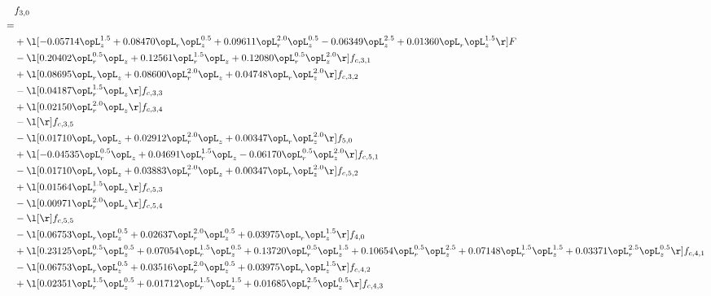 \begin{alignat}{2} 
\label{eq:f_30_2} 
& f_{3,0} \nonumber \\ 
 = \\ 
& + \l[  -0.05714 \opL_z^{1.5} +  0.08470 \opL_r \opL_z^{0.5} +  0.09611 \opL_r^{2.0} \opL_z^{0.5}   -0.06349 \opL_z^{2.5} +  0.01360 \opL_r \opL_z^{1.5}  \r] F \nonumber \\ 
& - \l[  0.20402 \opL_r^{0.5} \opL_z +  0.12561 \opL_r^{1.5} \opL_z +  0.12080 \opL_r^{0.5} \opL_z^{2.0}  \r] f_{c,3,1} \nonumber \\ 
& + \l[  0.08695 \opL_r \opL_z +  0.08600 \opL_r^{2.0} \opL_z +  0.04748 \opL_r \opL_z^{2.0}  \r] f_{c,3,2} \nonumber \\ 
& - \l[  0.04187 \opL_r^{1.5} \opL_z  \r] f_{c,3,3} \nonumber \\ 
& + \l[  0.02150 \opL_r^{2.0} \opL_z  \r] f_{c,3,4} \nonumber \\ 
& - \l[  \r] f_{c,3,5} \nonumber \\ 
& - \l[  0.01710 \opL_r \opL_z +  0.02912 \opL_r^{2.0} \opL_z +  0.00347 \opL_r \opL_z^{2.0}  \r] f_{5,0} \nonumber \\ 
& + \l[  -0.04535 \opL_r^{0.5} \opL_z +  0.04691 \opL_r^{1.5} \opL_z   -0.06170 \opL_r^{0.5} \opL_z^{2.0}  \r] f_{c,5,1} \nonumber \\ 
& - \l[  0.01710 \opL_r \opL_z +  0.03883 \opL_r^{2.0} \opL_z +  0.00347 \opL_r \opL_z^{2.0}  \r] f_{c,5,2} \nonumber \\ 
& + \l[  0.01564 \opL_r^{1.5} \opL_z  \r] f_{c,5,3} \nonumber \\ 
& - \l[  0.00971 \opL_r^{2.0} \opL_z  \r] f_{c,5,4} \nonumber \\ 
& - \l[  \r] f_{c,5,5} \nonumber \\ 
& - \l[  0.06753 \opL_r \opL_z^{0.5} +  0.02637 \opL_r^{2.0} \opL_z^{0.5} +  0.03975 \opL_r \opL_z^{1.5}  \r] f_{4,0} \nonumber \\ 
& + \l[  0.23125 \opL_r^{0.5} \opL_z^{0.5} +  0.07054 \opL_r^{1.5} \opL_z^{0.5} +  0.13720 \opL_r^{0.5} \opL_z^{1.5} +  0.10654 \opL_r^{0.5} \opL_z^{2.5} +  0.07148 \opL_r^{1.5} \opL_z^{1.5} +  0.03371 \opL_r^{2.5} \opL_z^{0.5}  \r] f_{c,4,1} \nonumber \\ 
& - \l[  0.06753 \opL_r \opL_z^{0.5} +  0.03516 \opL_r^{2.0} \opL_z^{0.5} +  0.03975 \opL_r \opL_z^{1.5}  \r] f_{c,4,2} \nonumber \\ 
& + \l[  0.02351 \opL_r^{1.5} \opL_z^{0.5} +  0.01712 \opL_r^{1.5} \opL_z^{1.5} +  0.01685 \opL_r^{2.5} \opL_z^{0.5}  \r] f_{c,4,3} \nonumber \\ 

\end{alignat}
